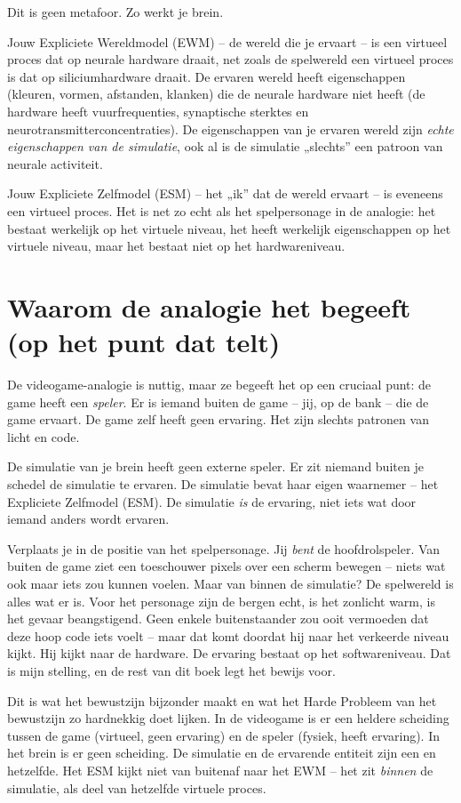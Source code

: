 \documentclass[11pt, twoside, openright]{book}
\begin{document}
Dit is geen metafoor. Zo werkt je brein.

Jouw Expliciete Wereldmodel (EWM) -- de wereld die je ervaart -- is een virtueel proces dat op neurale hardware draait, net zoals de spelwereld een virtueel proces is dat op siliciumhardware draait. De ervaren wereld heeft eigenschappen (kleuren, vormen, afstanden, klanken) die de neurale hardware niet heeft (de hardware heeft vuurfrequenties, synaptische sterktes en neurotransmitterconcentraties). De eigenschappen van je ervaren wereld zijn \textit{echte eigenschappen van de simulatie}, ook al is de simulatie „slechts” een patroon van neurale activiteit.

Jouw Expliciete Zelfmodel (ESM) -- het „ik” dat de wereld ervaart -- is eveneens een virtueel proces. Het is net zo echt als het spelpersonage in de analogie: het bestaat werkelijk op het virtuele niveau, het heeft werkelijk eigenschappen op het virtuele niveau, maar het bestaat niet op het hardwareniveau.

\section*{Waarom de analogie het begeeft (op het punt dat telt)}

De videogame-analogie is nuttig, maar ze begeeft het op een cruciaal punt: de game heeft een \textit{speler}. Er is iemand buiten de game -- jij, op de bank -- die de game ervaart. De game zelf heeft geen ervaring. Het zijn slechts patronen van licht en code.

De simulatie van je brein heeft geen externe speler. Er zit niemand buiten je schedel de simulatie te ervaren. De simulatie bevat haar eigen waarnemer -- het Expliciete Zelfmodel (ESM). De simulatie \textit{is} de ervaring, niet iets wat door iemand anders wordt ervaren.

Verplaats je in de positie van het spelpersonage. Jij \textit{bent} de hoofdrolspeler. Van buiten de game ziet een toeschouwer pixels over een scherm bewegen -- niets wat ook maar iets zou kunnen voelen. Maar van binnen de simulatie? De spelwereld is alles wat er is. Voor het personage zijn de bergen echt, is het zonlicht warm, is het gevaar beangstigend. Geen enkele buitenstaander zou ooit vermoeden dat deze hoop code iets voelt -- maar dat komt doordat hij naar het verkeerde niveau kijkt. Hij kijkt naar de hardware. De ervaring bestaat op het softwareniveau. Dat is mijn stelling, en de rest van dit boek legt het bewijs voor.

Dit is wat het bewustzijn bijzonder maakt en wat het Harde Probleem van het bewustzijn zo hardnekkig doet lijken. In de videogame is er een heldere scheiding tussen de game (virtueel, geen ervaring) en de speler (fysiek, heeft ervaring). In het brein is er geen scheiding. De simulatie en de ervarende entiteit zijn een en hetzelfde. Het ESM kijkt niet van buitenaf naar het EWM -- het zit \textit{binnen} de simulatie, als deel van hetzelfde virtuele proces.
\end{document}
